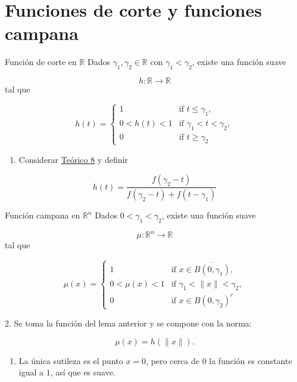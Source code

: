 \section{Funciones de corte y funciones campana}
\begin{booklemma}{Función de corte en $\mathbb R$}
Dados $\gamma_1,\gamma_2\in\mathbb R$ con $\gamma_1<\gamma_2$, existe una función suave

\[
h:\mathbb R\to\mathbb R
\]
tal que

\[
h(t)=\begin{cases} 1 & \text{if } t \le \gamma_1,\\ 0<h(t)<1 & \text{if } \gamma_1 < t < \gamma_2,\\ 0 & \text{if } t \ge \gamma_2 \end{cases}
\]



\end{booklemma}
\begin{bookproof}{}
\begin{enumerate}
\item Considerar \hyperref[blk:54d8a6]{Teórico 8} y definir
\end{enumerate}
\[
h(t)= \frac{f(\gamma_{2}-t)}{f(\gamma_{2}-t)+f(t-\gamma_{1})}
\]
\bookqed
\end{bookproof}
\label{blk:3df6bd}
\begin{booklemma}{Función campana en $\mathbb R^n$}
Dados $0<\gamma_1<\gamma_2$, existe una función suave

\[
\mu:\mathbb R^n\to\mathbb R
\]
tal que

\[
\mu(x)= \begin{cases}  1 & \text{if } x\in \overline{B(0,\gamma_1)},\\ 0<\mu(x)<1 & \text{if } \gamma_1<\|x\|<\gamma_2,\\ 0 & \text{if } x\in B(0,\gamma_2)^c \end{cases}
\]



\end{booklemma}
\begin{bookproof}{}
2. Se toma la función del lema anterior y se compone con la norma:

\[
\mu(x)=h(\|x\|).
\]
\begin{enumerate}[start=3]
\item La única sutileza es el punto $x=0$, pero cerca de $0$ la función es constante igual a $1$, así que es suave.
\end{enumerate}
\bookqed
\end{bookproof}
